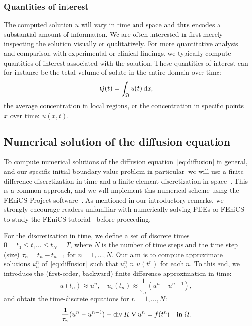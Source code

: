 
\subsubsection{Quantities of interest}
The computed solution $u$ will vary in time and space and thus encodes
a substantial amount of information. We are often interested in first
merely inspecting the solution visually or qualitatively. For more
quantitative analysis and comparison with experimental or clinical
findings, we typically compute quantities of interest associated with
the solution. These quantities of interest can for instance be the
total volume of solute in the entire domain over time:
\begin{equation}
  \label{eq:chp3:qoi}
  Q(t) = \int_{\Omega} u (t) \, \mathrm{d}x, 
\end{equation}
the average concentration in local regions, or the concentration in
specific points $x$ over time: $u(x, t)$.

\subsection{Numerical solution of the diffusion equation}
\label{sec:chp3:model-problem-numerical-formulation}

To compute numerical solutions of the diffusion
equation~\eqref{eq:diffusion} in general, and our specific
initial-boundary-value problem in particular, we will use a finite
difference discretization in time and a finite element discretization
in space~\cite{langtangen2019introduction,
  gockenbach2006understanding}. This is a common approach, and we will
implement this numerical scheme using the FEniCS Project
software~\cite{logg2012automated,alnaes2015fenics,langtangen2016solving}. As
mentioned in our introductory remarks, we strongly encourage readers
unfamiliar with numerically solving PDEs or FEniCS to study the FEniCS
tutorial~\cite{langtangen2016solving} before proceeding.

For the discretization in time, we define a set of discrete times $0 =
t_0 \leq t_1 \dots \leq t_N = T$, where $N$ is the number of time
steps and the time step (size) $\tau_n = t_n - t_{n-1}$ for $n = 1,
\dots, N$. Our aim is to compute approximate solutions $u^n_h$
of~\eqref{eq:diffusion} such that $u^n_h \approx u(t^n)$ for each
$n$. To this end, we introduce the (first-order, backward) finite
difference approximation in time:
\begin{equation}
  u(t_n) \approx u^n, \quad
  u_t(t_n) \approx \frac{1}{\tau_n} (u^n - u^{n-1}),
\end{equation}
and obtain the time-discrete equations for $n = 1, \dots, N$:
\begin{equation}
  \label{eq:chp3:time-discrete}
  \frac{1}{\tau_n} (u^n - u^{n-1}) - \operatorname{\mathrm{div}} K \operatorname{\nabla} u^n = f(t^n) \quad \text{in } \Omega. 
\end{equation}

